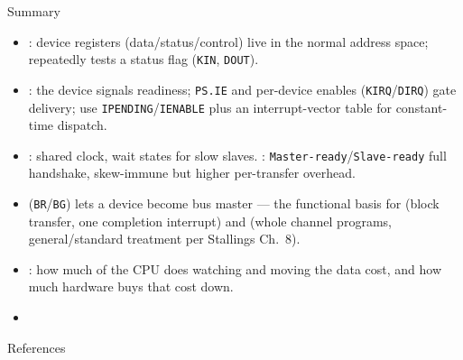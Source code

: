 \documentclass[aspectratio=169]{beamer}
\begin{document}
\begin{frame}{Summary}
  \begin{itemize}
    \item {}: device registers (data/status/control)
      live in the normal address space;  repeatedly tests a
      status flag (\texttt{KIN}, \texttt{DOUT}).
    \item {}: the device signals readiness; \texttt{PS.IE} and
      per-device enables (\texttt{KIRQ}/\texttt{DIRQ}) gate delivery;
       use \texttt{IPENDING}/\texttt{IENABLE} plus
      an interrupt-vector table for constant-time dispatch.
    \item {}: shared clock, wait states for slow slaves.
      : \texttt{Master-ready}/\texttt{Slave-ready} full
      handshake, skew-immune but higher per-transfer overhead.
    \item {} (\texttt{BR}/\texttt{BG}) lets a device
      become bus master --- the functional basis for  (block
      transfer, one completion interrupt) and  (whole channel
      programs, general/standard treatment per Stallings Ch.~8).
    \item {}: how much of the CPU does
      watching and moving the data cost, and how much hardware buys that
      cost down.
    \item {}
  \end{itemize}
\end{frame}

\begin{frame}{References}
  \footnotesize
  
  
\end{frame}
\end{document}
